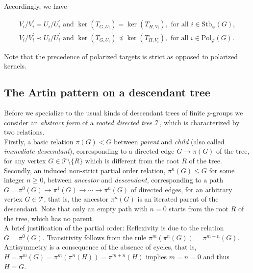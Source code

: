 \documentclass{amsart}
\theoremstyle{definition}
\numberwithin{equation}{section}
\begin{document}
\noindent
Accordingly, we have

\begin{equation}
\label{eqn:FixedChanged}
\begin{aligned}
V_i/V_i^\prime=U_i/U_i^\prime \text{ and } \ker(T_{G,U_i})=\ker(T_{H,V_i}), \text{ for all } i\in\mathrm{Stb}_{\varphi}(G), \\
V_i/V_i^\prime\prec U_i/U_i^\prime \text{ and } \ker(T_{G,U_i})\preceq\ker(T_{H,V_i}), \text{ for all } i\in\mathrm{Pol}_{\varphi}(G). 
\end{aligned}
\end{equation}

\noindent
Note that the precedence of polarized targets is strict as opposed to polarized kernels.



\subsection{The Artin pattern on a descendant tree}
\label{ss:APDescTree}

Before we specialize to the usual kinds of descendant trees of finite \(p\)-groups
\cite[\S\ 4, pp.163--164]{Ma5}
we consider an \textit{abstract form} of a \textit{rooted directed tree} \(\mathcal{T}\),
which is characterized by two relations.\\
Firstly, a basic relation
\(\pi(G)<G\)
between \textit{parent} and \textit{child} (also called \textit{immediate descendant}),
corresponding to a directed edge \(G\to\pi(G)\) of the tree,
for any vertex \(G\in\mathcal{T}\setminus\lbrace R\rbrace\)
which is different from the root \(R\) of the tree.\\
Secondly, an induced non-strict partial order relation,
\(\pi^n(G)\le G\) for some integer \(n\ge 0\),
between \textit{ancestor} and \textit{descendant},
corresponding to a path \(G=\pi^0(G)\to\pi^1(G)\to\cdots\to\pi^n(G)\) of directed edges,
for an arbitrary vertex \(G\in\mathcal{T}\), that is,
the ancestor \(\pi^n(G)\) is an iterated parent of the descendant.
Note that only an empty path with \(n=0\) starts from the root \(R\) of the tree,
which has no parent.\\
A brief justification of the partial order:
Reflexivity is due to the relation \(G=\pi^0(G)\).
Transitivity follows from the rule \(\pi^m(\pi^n(G))=\pi^{m+n}(G)\).
Antisymmetry is a consequence of the absence of cycles,
that is, \(H=\pi^m(G)=\pi^m(\pi^n(H))=\pi^{m+n}(H)\) implies \(m=n=0\) and thus \(H=G\).
\end{document}
